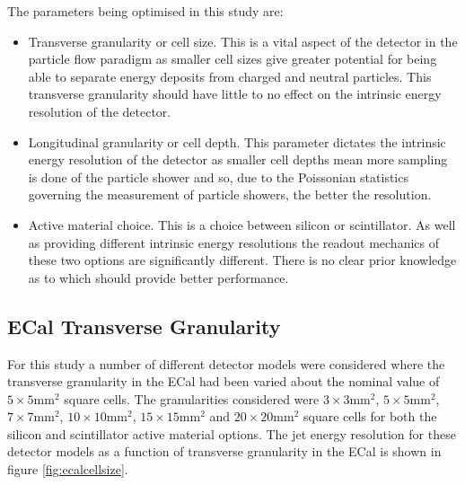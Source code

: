 The parameters being optimised in this study are:
\begin{itemize}
\item Transverse granularity or cell size.  This is a vital aspect of the detector in the particle flow paradigm as smaller cell sizes give greater potential for being able to separate energy deposits from charged and neutral particles.  This transverse granularity should have little to no effect on the intrinsic energy resolution of the detector.  
\item Longitudinal granularity or cell depth.  This parameter dictates the intrinsic energy resolution of the detector as smaller cell depths mean more sampling is done of the particle shower and so, due to the Poissonian statistics governing the measurement of particle showers, the better the resolution.
\item Active material choice.  This is a choice between silicon or scintillator.  As well as providing different intrinsic energy resolutions the readout mechanics of these two options are significantly different.  There is no clear prior knowledge as to which should provide better performance. 
\end{itemize}

\subsection{ECal Transverse Granularity}
For this study a number of different detector models were considered where the transverse granularity in the ECal had been varied about the nominal value of $5 \times 5 \text{mm}^{2}$ square cells.  The granularities considered were $3 \times 3 \text{mm}^{2}$, $5 \times 5 \text{mm}^{2}$, $7 \times 7 \text{mm}^{2}$, $10 \times 10 \text{mm}^{2}$, $15 \times 15 \text{mm}^{2}$ and $20 \times 20 \text{mm}^{2}$ square cells for both the silicon and scintillator active material options.  The jet energy resolution for these detector models as a function of transverse granularity in the ECal is shown in figure \ref{fig:ecalcellsize}.

